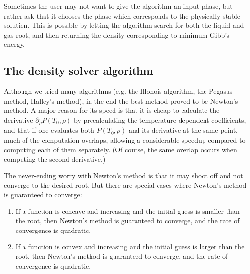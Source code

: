 \documentclass[internal,english]{sintefmemo2012}
\numberwithin{equation}{section}
\begin{document}
Sometimes the user may not want to give the algorithm an input phase,
but rather ask that it chooses the phase which corresponds to the physically
stable solution. This is possible by letting the algorithm search for
both the liquid and gas root, and then returning the density
corresponding to minimum Gibb's energy.

\subsection{The density solver algorithm}
Although we tried many algorithms (e.g. the Illonois algorithm, the
Pegasus method, Halley's method), in the end the best method
proved to be Newton's method. A major reason for its speed is that
it is cheap to calculate the derivative $\partial_\rho P(T_0,\rho)$ by precalculating the temperature dependent coefficients, and
that if one evaluates both $P(T_0,\rho)$ and its derivative at the
same point, much of the computation overlaps, allowing a considerable
speedup compared to computing each of them separately. (Of course, the same overlap occurs when computing the second derivative.)

The never-ending worry with Newton's method is that it may shoot off
and not converge to the desired root. But there are special cases where
Newton's method is guaranteed to converge:
\begin{enumerate}
\item If a function is concave and increasing and the initial guess is
  smaller than the root, then Newton's method is guaranteed to
  converge, and the rate of convergence is quadratic.
\item If a function is convex and increasing and the initial guess is
  larger than the root, then Newton's method is guaranteed to
  converge, and the rate of convergence is quadratic.
\end{enumerate}
\end{document}
